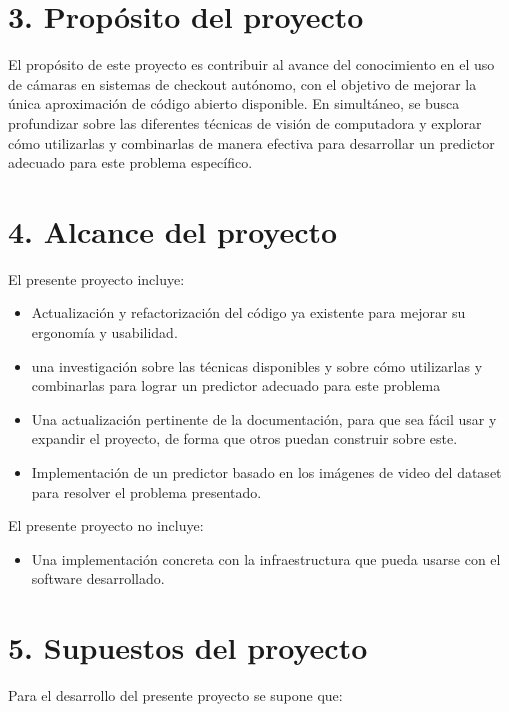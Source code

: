 \documentclass[
11pt, %
codirector, %
]{charter}
\begin{document}
\section{3. Propósito del proyecto}
\label{sec:proposito}

El propósito de este proyecto es contribuir al avance del conocimiento en el uso de cámaras en sistemas de checkout autónomo, con el objetivo de mejorar la única aproximación de código abierto disponible. En simultáneo, se busca profundizar sobre las diferentes técnicas de visión de computadora y explorar cómo utilizarlas y combinarlas de manera efectiva para desarrollar un predictor adecuado para este problema específico.

\section{4. Alcance del proyecto}
\label{sec:alcance}

El presente proyecto incluye:
\begin{itemize}

\item Actualización y refactorización del código ya existente para mejorar su ergonomía y usabilidad.
\item una investigación sobre las técnicas disponibles y sobre cómo utilizarlas y combinarlas para lograr un predictor adecuado para este problema
\item Una actualización pertinente de la documentación, para que sea fácil usar y expandir el proyecto, de forma que otros puedan construir sobre este.
\item Implementación de un predictor basado en los imágenes de video del dataset para resolver el problema presentado.
\end{itemize}

El presente proyecto no incluye:
\begin{itemize}
\item Una implementación concreta con la infraestructura que pueda usarse con el software desarrollado.
\end{itemize}


\section{5. Supuestos del proyecto}
\label{sec:supuestos}

Para el desarrollo del presente proyecto se supone que:
\end{document}

